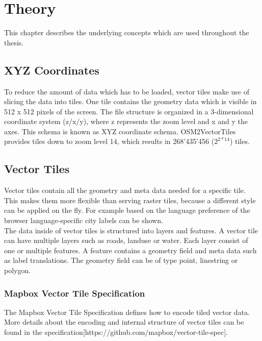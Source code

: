 \chapter{Theory}

This chapter describes the underlying concepts which are used throughout the thesis. 

\section{XYZ Coordinates}\label{part1_xyz_coordinates}

To reduce the amount of data which has to be loaded, vector tiles make use of slicing the data into tiles. One tile contains the geometry data which is visible in 512 x 512 pixels of the screen. The file structure is organized in a 3-dimensional coordinate system (z/x/y), where z represents the zoom level and x and y the axes. This schema is known as XYZ coordinate schema. OSM2VectorTiles provides tiles down to zoom level 14, which results in 268'435'456 ($2^{2*14}$) tiles.

\section{Vector Tiles}\label{part1_vector_tiles}

Vector tiles contain all the geometry and meta data needed for a specific tile. This makes them more flexible than serving raster tiles, because a different style can be applied on the fly. For example based on the language preference of the browser language-specific city labels can be shown.\\
The data inside of vector tiles is structured into layers and features. A vector tile can have multiple layers such as roads, landuse or water. Each layer consist of one or multiple features. A feature contains a geometry field and meta data such as label translations. The geometry field can be of type point, linestring or polygon. 

\subsection{Mapbox Vector Tile Specification}\label{part1_vector_tile_specification}

The Mapbox Vector Tile Specification defines how to encode tiled vector data. More details about the encoding and internal structure of vector tiles can be found in the specification[https://github.com/mapbox/vector-tile-spec].

